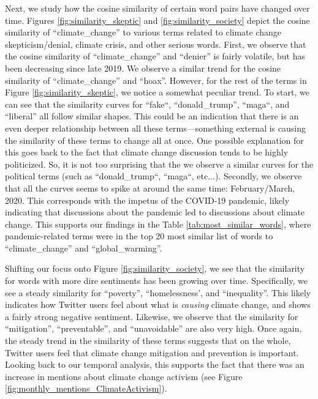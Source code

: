 \documentclass{paper}
\begin{document}
Next, we study how the cosine similarity of certain word pairs have changed over time. Figures \ref{fig:similarity_skeptic} and \ref{fig:similarity_society} depict the cosine similarity of ``climate\_change'' to various terms related to climate change skepticism/denial, climate crisis, and other serious words. First, we observe that the cosine similarity of ``climate\_change'' and ``denier'' is fairly volatile, but has been decreasing since late 2019. We observe a similar trend for the cosine similarity of ``climate\_change'' and ``hoax''. However, for the rest of the terms in Figure \ref{fig:similarity_skeptic}, we notice a somewhat peculiar trend. To start, we can see that the similarity curves for ``fake``, ``donald\_trump'', ``maga``, and ``liberal'' all follow similar shapes. This could be an indication that there is an even deeper relationship between all these terms---something external is causing the similarity of these terms to change all at once. One possible explanation for this goes back to the fact that climate change discussion tends to be highly politicized. So, it is not too surprising that the we observe a similar curves for the political terms (such as ``donald\_trump``, ``maga``, etc...). Secondly, we observe that all the curves seems to spike at around the same time: February/March, 2020. This corresponds with the impetus of the COVID-19 pandemic, likely indicating that discussions about the pandemic led to discussions about climate change. This supports our findings in the Table \ref{tab:most_similar_words}, where pandemic-related terms were in the top 20 most similar list of words to ``climate\_change'' and ``global\_warming''.

Shifting our focus onto Figure \ref{fig:similarity_society}, we see that the similarity for words with more dire sentiments has been growing over time. Specifically, we see a steady similarity for ``poverty'', ``homelessness', and ``inequality''. This likely indicates how Twitter users feel about what is \textit{causing} climate change, and shows a fairly strong negative sentiment. Likewise, we observe that the similarity for ``mitigation'', ``preventable'', and ``unavoidable'' are also very high. Once again, the steady trend in the similarity of these terms suggests that on the whole, Twitter users feel that climate change mitigation and prevention is important. Looking back to our temporal analysis, this supports the fact that there was an increase in mentions about climate change activism (see Figure \ref{fig:monthly_mentions_ClimateActivism}).
\end{document}

